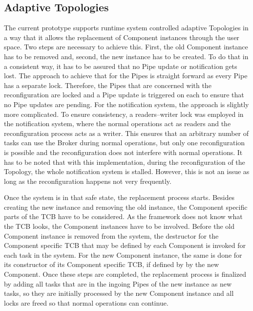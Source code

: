 \subsection{Adaptive Topologies}%
\label{sec:impl:topology:adaptive}

The current \cobas{} prototype supports runtime system controlled adaptive Topologies in a way that it allows the replacement of Component instances through the user space. Two steps are necessary to achieve this. First, the old Component instance has to be removed and, second, the new instance has to be created. To do that in a consistent way, it has to be assured that no Pipe update or notification gets lost. The approach to achieve that for the Pipes is straight forward as every Pipe has a separate lock. Therefore, the Pipes that are concerned with the reconfiguration are locked and a Pipe update is triggered on each to ensure that no Pipe updates are pending. For the notification system, the approach is slightly more complicated. To ensure consistency, a readers–writer lock was employed in the notification system, where the normal operations act as readers and the reconfiguration process acts as a writer. This ensures that an arbitrary number of tasks can use the \cobas{} Broker during normal operations, but only one reconfiguration is possible and the reconfiguration does not interfere with normal operations. It has to be noted that with this implementation, during the reconfiguration of the Topology, the whole notification system is stalled. However, this is not an issue as long as the reconfiguration happens not very frequently.

Once the system is in that safe state, the replacement process starts. Besides creating the new instance and removing the old instance, the Component specific parts of the \ac{TCB} have to be considered. As the framework does not know what the \ac{TCB} looks, the Component instances have to be involved. Before the old Component instance is removed from the system, the destructor for the Component specific \ac{TCB} that may be defined by each Component is invoked for each task in the system. For the new Component instance, the same is done for its constructor of its Component specific \ac{TCB}, if defined by by the new Component. Once these steps are completed, the replacement process is finalized by adding all tasks that are in the ingoing Pipes of the new instance as new tasks, so they are initially processed by the new Component instance and all locks are freed so that normal operations can continue.

